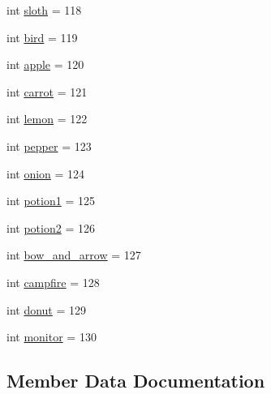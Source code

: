 \begin{DoxyCompactItemize}
\item 
int \hyperlink{classbridges_1_1named__symbol_1_1_named_symbol_acaeb03fef19ac83a37b253fcfca4afed}{sloth} = 118
\item 
int \hyperlink{classbridges_1_1named__symbol_1_1_named_symbol_afcd9a0ea3219632a87080f7c969599ba}{bird} = 119
\item 
int \hyperlink{classbridges_1_1named__symbol_1_1_named_symbol_a0f0470a1b7c7505dabafca894c4d5fd4}{apple} = 120
\item 
int \hyperlink{classbridges_1_1named__symbol_1_1_named_symbol_a9120328bcafa98d2a72ddf88d770127c}{carrot} = 121
\item 
int \hyperlink{classbridges_1_1named__symbol_1_1_named_symbol_a57822a497f85ee95cb4931506160a751}{lemon} = 122
\item 
int \hyperlink{classbridges_1_1named__symbol_1_1_named_symbol_af652e927923548f49e3abf446f1f4d6e}{pepper} = 123
\item 
int \hyperlink{classbridges_1_1named__symbol_1_1_named_symbol_a9ea1aacaa57384079439cf00100a34c3}{onion} = 124
\item 
int \hyperlink{classbridges_1_1named__symbol_1_1_named_symbol_a2c0ff77ec8de721df53a4ff9de2ff109}{potion1} = 125
\item 
int \hyperlink{classbridges_1_1named__symbol_1_1_named_symbol_adcc41fdbb3c384cfcbc8d14a1876aefb}{potion2} = 126
\item 
int \hyperlink{classbridges_1_1named__symbol_1_1_named_symbol_a166b250b8227e437800a57c3f6baf47c}{bow\+\_\+and\+\_\+arrow} = 127
\item 
int \hyperlink{classbridges_1_1named__symbol_1_1_named_symbol_ab244958b6c372eb3e019b7acb6ad795c}{campfire} = 128
\item 
int \hyperlink{classbridges_1_1named__symbol_1_1_named_symbol_ab9dff843fa3f0a5b0d14b3a9b7179e88}{donut} = 129
\item 
int \hyperlink{classbridges_1_1named__symbol_1_1_named_symbol_a1371520afedc69574d5129699de3c298}{monitor} = 130
\end{DoxyCompactItemize}


\subsection{Member Data Documentation}
\mbox{\label{classbridges_1_1named__symbol_1_1_named_symbol_ad5f315e2dbd3b3c40e9ce00947bda2ca}} 
